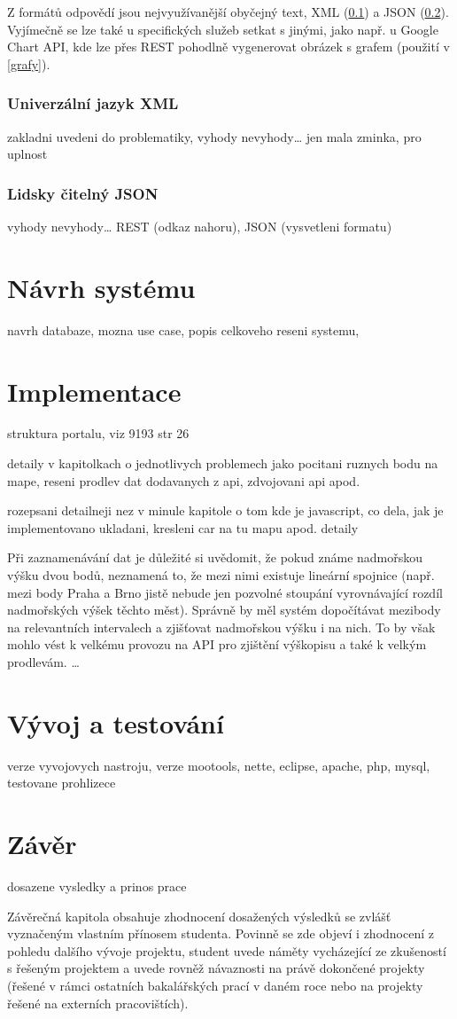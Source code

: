 Z formátů odpovědí jsou nejvyužívanější obyčejný text, XML (\ref{xml})
a JSON (\ref{json}). Vyjímečně se lze také u specifických služeb
setkat s jinými, jako např. u Google Chart API, kde lze přes REST
pohodlně vygenerovat obrázek s grafem (použití v \ref{grafy}).

\subsection{Univerzální jazyk XML}\label{xml}
zakladni uvedeni do problematiky, vyhody nevyhody\ldots
jen mala zminka, pro uplnost
\subsection{Lidsky čitelný JSON}\label{json}
vyhody nevyhody\ldots
REST (odkaz nahoru), JSON (vysvetleni formatu)

\chapter{Návrh systému}
navrh databaze, mozna use case, popis celkoveho reseni systemu,

\chapter{Implementace}
struktura portalu, viz 9193 str 26

detaily v kapitolkach o jednotlivych problemech jako pocitani ruznych bodu na mape, reseni prodlev dat
dodavanych z api, zdvojovani api apod.

rozepsani detailneji nez v minule kapitole o tom kde je javascript,
co dela, jak je implementovano ukladani, kresleni car na tu mapu
apod. detaily

Při zaznamenávání dat je důležité si uvědomit, že pokud známe
nadmořskou výšku dvou bodů, neznamená to, že mezi nimi existuje
lineární spojnice (např. mezi body Praha a Brno jistě nebude jen
pozvolné stoupání vyrovnávající rozdíl nadmořských výšek těchto
měst). Správně by měl systém dopočítávat mezibody na relevantních
intervalech a zjišťovat nadmořskou výšku i na nich. To by však mohlo
vést k velkému provozu na API pro zjištění výškopisu a také k velkým
prodlevám. \ldots

\chapter{Vývoj a testování}
verze vyvojovych nastroju, verze mootools, nette, eclipse, apache,
php, mysql, testovane prohlizece

\chapter*{Závěr}
dosazene vysledky a prinos prace

Závěrečná kapitola obsahuje zhodnocení dosažených výsledků se zvlášť
vyznačeným vlastním přínosem studenta. Povinně se zde objeví i
zhodnocení z pohledu dalšího vývoje projektu, student uvede náměty
vycházející ze zkušeností s řešeným projektem a uvede rovněž
návaznosti na právě dokončené projekty (řešené v rámci ostatních
bakalářských prací v daném roce nebo na projekty řešené na externích
pracovištích).
